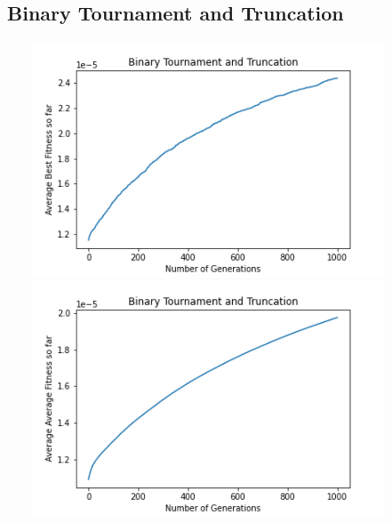 \documentclass[a4paper]{article}
\begin{document}
\subsection{Binary Tournament and Truncation}
\includegraphics[width=12cm, height=7cm]{Graphs/TSP/bt_trunc_bsf.png} \\
\includegraphics[width=12cm, height=7cm]{Graphs/TSP/bt_trunc_avg.png} \\
\end{document}
